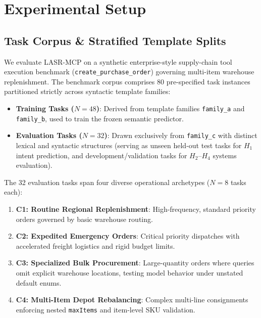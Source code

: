 \section{Experimental Setup}
\label{sec:setup}

\subsection{Task Corpus \& Stratified Template Splits}
We evaluate LASR-MCP on a synthetic enterprise-style supply-chain tool execution benchmark (\texttt{create\_purchase\_order}) governing multi-item warehouse replenishment. The benchmark corpus comprises 80 pre-specified task instances partitioned strictly across syntactic template families:
\begin{itemize}
    \item \textbf{Training Tasks ($N=48$)}: Derived from template families \texttt{family\_a} and \texttt{family\_b}, used to train the frozen semantic predictor.
    \item \textbf{Evaluation Tasks ($N=32$)}: Drawn exclusively from \texttt{family\_c} with distinct lexical and syntactic structures (serving as unseen held-out test tasks for $H_1$ intent prediction, and development/validation tasks for $H_2$--$H_4$ systems evaluation).
\end{itemize}
The 32 evaluation tasks span four diverse operational archetypes ($N=8$ tasks each):
\begin{enumerate}
    \item \textbf{C1: Routine Regional Replenishment}: High-frequency, standard priority orders governed by basic warehouse routing.
    \item \textbf{C2: Expedited Emergency Orders}: Critical priority dispatches with accelerated freight logistics and rigid budget limits.
    \item \textbf{C3: Specialized Bulk Procurement}: Large-quantity orders where queries omit explicit warehouse locations, testing model behavior under unstated default enums.
    \item \textbf{C4: Multi-Item Depot Rebalancing}: Complex multi-line consignments enforcing nested \texttt{maxItems} and item-level SKU validation.
\end{enumerate}

